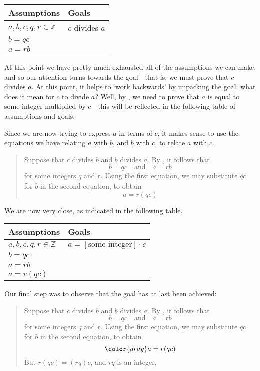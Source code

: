\begin{example}
\begin{center}
\begin{tabular}{C{150pt}|C{150pt}}
\textbf{Assumptions} & \textbf{Goals} \\ \hline
$a,b,c,q,r \in \mathbb{Z}$ & $c$ divides $a$ \\
$b=qc$ & \\
$a=rb$ &
\end{tabular}
\end{center}

At this point we have pretty much exhausted all of the assumptions we can make, and so our attention turns towards the goal---that is, we must prove that $c$ divides $a$. At this point, it helps to `work backwards' by unpacking the goal: what does it mean for $c$ to divide $a$? Well, by , we need to prove that $a$ is equal to some integer multiplied by $c$---this will be reflected in the following table of assumptions and goals.

Since we are now trying to express $a$ in terms of $c$, it makes sense to use the equations we have relating $a$ with $b$, and $b$ with $c$, to relate $a$ with $c$.

\begin{quote}
{\color{gray} Suppose that $c$ divides $b$ and $b$ divides $a$. By , it follows that
\[
b=qc \quad \text{and} \quad a=rb
\]
for some integers $q$ and $r$.} Using the first equation, we may substitute $qc$ for $b$ in the second equation, to obtain
\[
a=r(qc)
\]
\end{quote}

We are now very close, as indicated in the following table.

\begin{center}
\begin{tabular}{C{150pt}|C{150pt}}
\textbf{Assumptions} & \textbf{Goals} \\ \hline
$a,b,c,q,r \in \mathbb{Z}$ & $a = [\text{some integer}] \cdot c$ \\
$b=qc$ & \\
$a=rb$ & \\
$a=r(qc)$ & 
\end{tabular}
\end{center}

Our final step was to observe that the goal has at last been achieved:

\begin{quote}
{\color{gray} Suppose that $c$ divides $b$ and $b$ divides $a$. By , it follows that
\[
b=qc \quad \text{and} \quad a=rb
\]
for some integers $q$ and $r$. Using the first equation, we may substitute $qc$ for $b$ in the second equation, to obtain}
\[
{\color{gray} a=r(qc)}
\]
But $r(qc) = (rq)c$, and $rq$ is an integer,
\end{quote}


\end{example}
